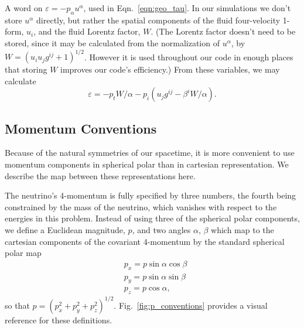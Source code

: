 A word on $\varepsilon=-p_\alpha u^\alpha$, used in Eqn.~\ref{eqn:geo_tau}.
In our simulations we don't store $u^\alpha$ directly, but rather the spatial
components of the fluid four-velocity 1-form, $u_i$, and the fluid Lorentz
factor, $W$. (The Lorentz factor doesn't need to be stored, since it may
be calculated from the normalization of $u^\alpha$, by
$W=(u_iu_jg^{ij}+1)^{1/2}$. However it is used throughout our code in enough
places that storing $W$ improves our code's efficiency.)
From these variables, we may calculate
\begin{equation}
  \varepsilon = -p_t W/\alpha -p_i(u_j g^{ij}-\beta^i W/\alpha).
\end{equation}

\subsection{Momentum Conventions}
\label{ssec:p_conventions}
Because of the natural symmetries of our spacetime, it is more convenient to use
momentum components in spherical polar than in cartesian representation. We
describe the map between these representations here.

The neutrino's 4-momentum is fully specified by three numbers, the fourth being
constrained by the mass of the neutrino, which vanishes with respect to the
energies in this problem. Instead of using three of the spherical polar
components, we define a Euclidean magnitude, $p$, and two angles $\alpha$,
$\beta$ which map to the cartesian components of the covariant 4-momentum by
the standard spherical polar map
\begin{align}
  &p_x = p\sin\alpha\cos\beta \\
  &p_y = p\sin\alpha\sin\beta \\
  &p_z = p\cos\alpha,
\end{align}
so that $p = (p_x^2+p_y^2+p_z^2)^{1/2}$.
Fig.~\ref{fig:p_conventions} provides a visual reference for these definitions.

